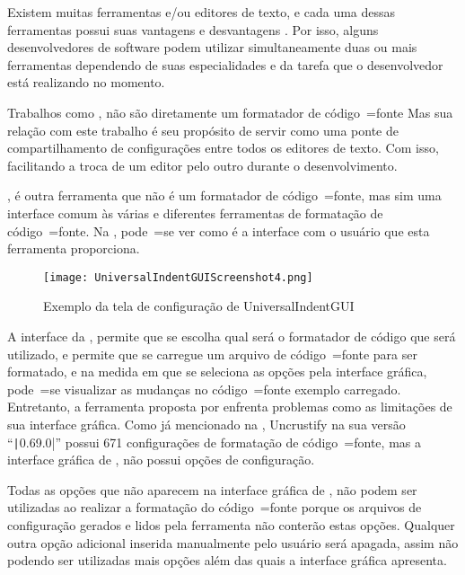 Existem muitas ferramentas e\slash{}ou editores de texto,
e cada uma dessas ferramentas possui suas vantagens e
desvantagens \cite{prettyPrintingOfVisualSentences,anAbstractPrettyPrinter,improvingRefactoringSpeed}.
Por isso,
alguns desenvolvedores de software podem utilizar simultaneamente duas ou
mais ferramentas dependendo de suas especialidades e
da tarefa que o desenvolvedor está realizando no momento.

Trabalhos como ,
não são diretamente um formatador de código~=fonte Mas sua relação com este trabalho é seu propósito de servir como uma ponte de compartilhamento de configurações entre todos os editores de texto.
Com isso,
facilitando a troca de um editor pelo outro durante o desenvolvimento.

,
é outra ferramenta que não é um formatador de código~=fonte,
mas sim uma interface comum às várias e
diferentes ferramentas de formatação de código~=fonte.
Na ,
pode~=se ver como é a interface com o usuário que esta ferramenta proporciona.

\begin{figure}[!htb]
\caption{Exemplo da tela de configuração de UniversalIndentGUI}
\label{figure:UniversalIndentGUIScreenshot4}
\centering
\texttt{[image: UniversalIndentGUIScreenshot4.png]}
\end{figure}

A interface da ,
permite que se escolha qual será o formatador de código que será utilizado,
e permite que se carregue um arquivo de código~=fonte para ser formatado,
e na medida em que se seleciona as opções pela interface gráfica,
pode~=se visualizar as mudanças no código~=fonte exemplo carregado.
Entretanto,
a ferramenta proposta por  enfrenta problemas como as limitações de sua interface gráfica.
Como já mencionado na ,
Uncrustify na sua versão ``\texttt|0.69.0|'' possui 671 configurações de formatação de código~=fonte,
mas a interface gráfica de ,
não possui  opções de configuração.

Todas as opções que não aparecem na interface gráfica de ,
não podem ser utilizadas ao realizar a formatação do código~=fonte porque os arquivos de configuração gerados e
lidos pela ferramenta não conterão estas opções.
Qualquer outra opção adicional inserida manualmente pelo usuário será apagada,
assim não podendo ser utilizadas mais opções além das quais a interface gráfica apresenta.

